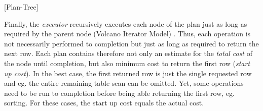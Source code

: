 [Plan-Tree]

Finally, the \textit{executor} recursively executes each node of the plan just as long as required by the parent node (Volcano Iterator Model) \cite{volcano}. Thus, each operation is not necessarily performed to completion but just as long as required to return the next row. Each plan contains therefore not only an estimate for the \textit{total cost} of the node until completion, but also minimum cost to return the first row (\textit{start up cost}). In the best case, the first returned row is just the single requested row and eg. the entire remaining table scan can be omitted. Yet, some operations need to be run to completion before being able returning the first row, eg. sorting. For these cases, the start up cost equals the actual cost.









